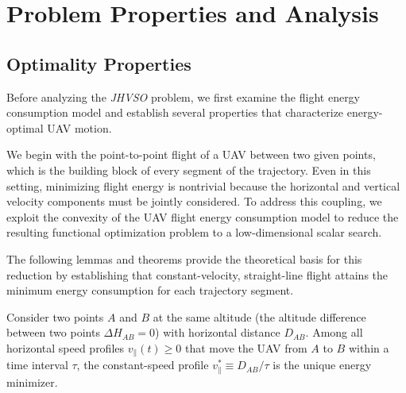 \section{Problem Properties and  Analysis}
\label{sec:problemanalysis}

\subsection{Optimality Properties}

Before analyzing the \textit{JHVSO} problem, we first examine the flight energy consumption model and establish several properties that characterize energy-optimal UAV motion.

We begin with the point-to-point flight of a UAV between two given points, which is the building block of every segment of the trajectory.
Even in this setting, minimizing flight energy is nontrivial because the horizontal and vertical velocity components must be jointly considered.
To address this coupling, we exploit the convexity of the UAV flight energy consumption model to reduce the resulting functional optimization problem to a low-dimensional scalar search.

The following lemmas and theorems provide the theoretical basis for this reduction by establishing that constant-velocity, straight-line flight attains the minimum energy consumption for each trajectory segment.

\begin{lemma}
\label{lem:horizontal-constant-speed}
Consider two points $A$ and $B$ at the same altitude (the altitude difference between two points $\Delta H_{AB} = 0$) with horizontal distance $D_{AB}$.
Among all horizontal speed profiles $v_{\parallel}(t) \ge 0$ that move the UAV from $A$ to $B$ within a time interval $\tau$, the constant-speed profile $v_{\parallel}^{*} \equiv D_{AB}/\tau$ is the unique energy minimizer.
\end{lemma}

